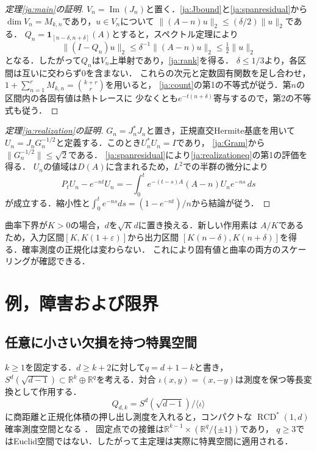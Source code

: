 \documentclass[12pt]{amsart}
\theoremstyle{definition}
\theoremstyle{remark}
\numberwithin{equation}{section}
\DeclareMathOperator{\Imageop}{Im}
\newcommand{\Image}[1]{\Imageop(#1)}
\newcommand{\R}{\mathbb{R}}
\newcommand{\RCD}{\operatorname{RCD}^{*}}
\newcommand{\one}{\mathbf 1}
\newcommand{\eps}{\varepsilon}
\theoremstyle{plain}
\begin{document}
\begin{proof}[定理\ref{ja:main}の証明]
$V_n=\Image{J_n}$と置く．\eqref{ja:Jbound}と\eqref{ja:spanresidual}から
$\dim V_n=M_{k,n}$であり，$u\in V_n$について
$\|(A-n)u\|_2\leq(\delta/2)\|u\|_2$である．
$Q_n=\one_{[n-\delta,n+\delta]}(A)$とすると，スペクトル定理により
\[
 \|(I-Q_n)u\|_2\leq\delta^{-1}\|(A-n)u\|_2
                         \leq\tfrac12\|u\|_2
\]
となる．したがって$Q_n$は$V_n$上単射であり，\eqref{ja:rank}を得る．
$\delta\leq1/3$より，各区間は互いに交わらず$0$を含まない．
これらの次元と定数固有関数を足し合わせ，
$1+\sum_{n=1}^rM_{k,n}=\binom{k+r}{r}$を用いると，
\eqref{ja:count}の第1の不等式が従う．第$n$の区間内の各固有値は熱トレースに
少なくとも$e^{-t(n+\delta)}$寄与するので，第2の不等式も従う．
\end{proof}

\begin{proof}[定理\ref{ja:realization}の証明]
$G_n=J_n^*J_n$と置き，正規直交Hermite基底を用いて
$U_n=J_nG_n^{-1/2}$と定義する．このとき$U_n^*U_n=I$であり，
\eqref{ja:Gram}から$\|G_n^{-1/2}\|\leq\sqrt2$である．
\eqref{ja:spanresidual}により\eqref{ja:realizationeq}の第1の評価を得る．
$U_n$の値域は$D(A)$に含まれるため，$L^2$での半群の微分により
\[
 P_tU_n-e^{-nt}U_n
 =-\int_0^t e^{-(t-s)A}(A-n)U_n e^{-ns}\,ds
\]
が成立する．縮小性と$\int_0^te^{-ns}ds=(1-e^{-nt})/n$から結論が従う．
\end{proof}

曲率下界が$K>0$の場合，$d$を$\sqrt K d$に置き換える．新しい作用素は
$A/K$であるため，入力区間$[K,K(1+\eps)]$から出力区間
$[K(n-\delta),K(n+\delta)]$を得る．確率測度の正規化は変わらない．
これにより固有値と曲率の両方のスケーリングが確認できる．

\section{例，障害および限界}
\subsection{任意に小さい欠損を持つ特異空間}
$k\geq1$を固定する．$d\geq k+2$に対して$q=d+1-k$と書き，
$S^d(\sqrt{d-1})\subset\R^k\oplus\R^q$を考える．対合
$\iota(x,y)=(x,-y)$は測度を保つ等長変換として作用する．
\[
 Q_{d,k}=S^d(\sqrt{d-1})/\langle\iota\rangle
\]
に商距離と正規化体積の押し出し測度を入れると，コンパクトな
$\RCD(1,d)$確率測度空間となる
\cite[Theorem 1.1 and Corollary 1.2]{ja:GKMS}．
固定点での接錐は$\R^{k-1}\times(\R^q/\{\pm1\})$であり，
$q\geq3$ではEuclid空間ではない．したがって主定理は実際に特異空間に適用される．
\end{document}
